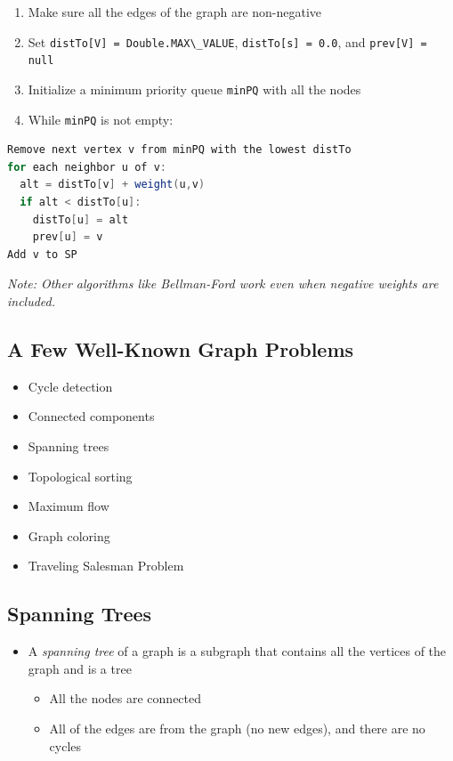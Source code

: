 \documentclass[
  10pt,
  english,
  letterpaper,
,tablecaptionabove
]{scrartcl}
\newcommand{\passthrough}[1]{#1}
\providecommand{\tightlist}{%
  \setlength{\itemsep}{0pt}\setlength{\parskip}{0pt}}
\begin{document}
\begin{enumerate}
\def\labelenumi{\arabic{enumi}.}
\tightlist
\item
  Make sure all the edges of the graph are non-negative
\item
  Set \passthrough{\lstinline!distTo[V] = Double.MAX\_VALUE!},
  \passthrough{\lstinline!distTo[s] = 0.0!}, and
  \passthrough{\lstinline!prev[V] = null!}
\item
  Initialize a minimum priority queue \passthrough{\lstinline!minPQ!}
  with all the nodes
\item
  While \passthrough{\lstinline!minPQ!} is not empty:
\end{enumerate}

\begin{lstlisting}[language=Java]
Remove next vertex v from minPQ with the lowest distTo
for each neighbor u of v:
  alt = distTo[v] + weight(u,v)
  if alt < distTo[u]:
    distTo[u] = alt
    prev[u] = v
Add v to SP
\end{lstlisting}

\emph{Note: Other algorithms like Bellman-Ford work even when negative
weights are included.}

\hypertarget{a-few-well-known-graph-problems}{%
\subsection{A Few Well-Known Graph
Problems}\label{a-few-well-known-graph-problems}}

\begin{itemize}
\tightlist
\item
  Cycle detection
\item
  Connected components
\item
  Spanning trees
\item
  Topological sorting
\item
  Maximum flow
\item
  Graph coloring
\item
  Traveling Salesman Problem
\end{itemize}

\hypertarget{spanning-trees}{%
\subsection{Spanning Trees}\label{spanning-trees}}

\begin{itemize}
\tightlist
\item
  A \emph{spanning tree} of a graph is a subgraph that contains all the
  vertices of the graph and is a tree

  \begin{itemize}
  \tightlist
  \item
    All the nodes are connected
  \item
    All of the edges are from the graph (no new edges), and there are no
    cycles
  \end{itemize}
\end{itemize}
\end{document}

